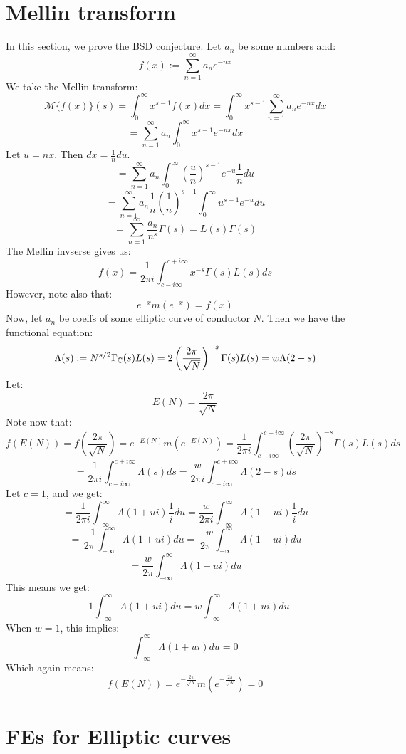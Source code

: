 \documentclass[a4paper]{amsart}
\begin{document}
\section{Mellin transform}
In this section, we prove the BSD conjecture. Let $a_n$ be some numbers and:
$$f(x) := \sum_{n = 1}^\infty a_n e^{-nx}$$
We take the Mellin-transform: 
$$\mathcal{M}\{f(x)\}(s) = \int_0^\infty x^{s - 1} f(x) dx = \int_0^\infty x^{s - 1} \sum_{n = 1}^\infty a_n e^{-nx} dx$$
$$ = \sum_{n = 1}^\infty a_n \int_0^\infty x^{s - 1} e^{-nx} dx$$
Let $u = nx$. Then $dx = \frac{1}{n} du$.
$$ = \sum_{n = 1}^\infty a_n \int_0^\infty \left(\frac{u}{n}\right)^{s - 1} e^{-u} \frac{1}{n} du$$
$$ = \sum_{n = 1}^\infty a_n \frac{1}{n} \left(\frac{1}{n}\right)^{s - 1} \int_0^\infty u^{s - 1} e^{-u} du$$
$$ = \sum_{n = 1}^\infty \frac{a_n}{n^s} \Gamma(s) = L(s) \Gamma(s)$$
The Mellin invserse gives us: 
$$f(x) = \frac{1}{2\pi i}\int_{c - i \infty}^{c + i \infty} x^{-s} \Gamma(s) L(s)ds$$
However, note also that:
$$e^{-x}m(e^{-x}) = f(x)$$
Now, let $a_n$ be coeffs of some elliptic curve of conductor $N$. Then we have the functional equation:
$$\Lambda(s) := N^{s/2} \Gamma_{\mathbb{C}}(s) L(s) = 2 \left(\frac{2\pi}{\sqrt{N}}\right)^{-s} \Gamma(s) L(s) = w\Lambda(2 - s)$$
Let:
$$E(N) = \frac{2\pi}{\sqrt{N}}$$
Note now that:
$$ f(E(N)) = f\left(\frac{2\pi}{\sqrt{N}}\right) = e^{-E(N)} m\left(e^{-E(N)}\right) = \frac{1}{2\pi i} \int_{c - i \infty}^{c + i \infty} \left(\frac{2\pi}{\sqrt{N}}\right)^{-s} \Gamma(s) L(s)ds$$
$$ = \frac{1}{2\pi i} \int_{c - i \infty}^{c + i \infty} \Lambda(s) ds = \frac{w}{2\pi i}\int_{c - i \infty}^{c + i \infty} \Lambda(2 - s) ds$$
Let $c = 1$,  and we get:
$$ = \frac{1}{2\pi i} \int_{-\infty}^{\infty} \Lambda(1 + ui) \frac{1}{i}du = \frac{w}{2\pi i}\int_{-\infty}^{\infty} \Lambda(1 - ui) \frac{1}{i}du$$
$$ = \frac{-1}{2\pi} \int_{-\infty}^{\infty} \Lambda(1 + ui) du = \frac{-w}{2\pi}\int_{-\infty}^{\infty} \Lambda(1 - ui) du$$
$$ = \frac{w}{2\pi}\int_{-\infty}^{\infty} \Lambda(1 + ui) du$$
This means we get:
$$-1 \int_{-\infty}^{\infty} \Lambda(1 + ui) du = w\int_{-\infty}^{\infty} \Lambda(1 + ui) du$$
When $w = 1$, this implies:
$$\int_{-\infty}^{\infty} \Lambda(1 + ui) du = 0$$
Which again means: 
$$f(E(N)) = e^{-\frac{2\pi}{\sqrt{N}}} m\left(e^{-\frac{2\pi}{\sqrt{N}}}\right) = 0$$

\section{FEs for Elliptic curves}
\end{document}
